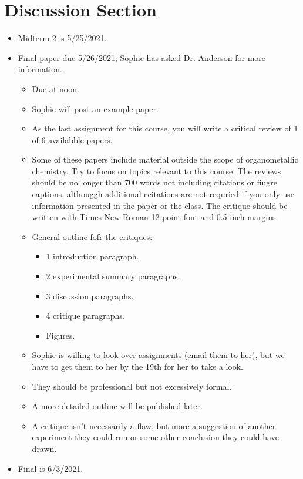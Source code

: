 \documentclass[../notes.tex]{subfiles}
\begin{document}
\section{Discussion Section}
\begin{itemize}
    \item {}Midterm 2 is 5/25/2021.
    \item Final paper due 5/26/2021; Sophie has asked Dr. Anderson for more information.
    \begin{itemize}
        \item Due at noon.
        \item Sophie will post an example paper.
        \item As the last assignment for this course, you will write a critical review of 1 of 6 availabble papers.
        \item Some of these papers include material outside the scope of organometallic chemistry. Try to focus on topics relevant to this course. The reviews should be no longer than 700 words not including citations or fiugre captions, althouggh additional ccitations are not requried if you only use information presented in the paper or the class. The critique should be written with Times New Roman 12 point font and 0.5 inch margins.
        \item General outline fofr the critiques:
        \begin{itemize}
            \item 1 introduction paragraph.
            \item 2 experimental summary paragraphs.
            \item 3 discussion paragraphs.
            \item 4 critique paragraphs.
            \item Figures.
        \end{itemize}
        \item Sophie is willing to look over assignments (email them to her), but we have to get them to her by the 19th for her to take a look.
        \item They should be professional but not excessively formal.
        \item A more detailed outline will be published later.
        \item A critique isn't necessarily a flaw, but more a suggestion of another experiment they could run or some other conclusion they could have drawn.
    \end{itemize}
    \item Final is 6/3/2021.

\end{itemize}
\end{document}
